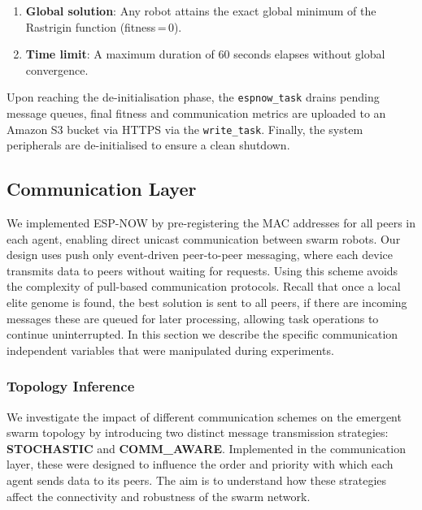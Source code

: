 \documentclass[conference]{IEEEtran}
\begin{document}
\begin{enumerate}
  \item \textbf{Global solution}: Any robot attains the exact global minimum of the Rastrigin function (fitness\,=\,0).
  \item \textbf{Time limit}: A maximum duration of 60 seconds elapses without global convergence.
\end{enumerate}

Upon reaching the de-initialisation phase, the \texttt{espnow\_task} drains pending message queues, final fitness and communication metrics are uploaded to an Amazon S3 bucket via HTTPS via the \texttt{write\_task}. Finally, the system peripherals are de-initialised to ensure a clean shutdown.

\subsection{Communication Layer}\label{sec:comm-layer}

We implemented ESP-NOW by pre-registering the MAC addresses for all peers in each agent, enabling direct unicast communication between swarm robots. Our design uses push only event-driven peer-to-peer messaging, where each device transmits data to peers without waiting for requests. Using this scheme avoids the complexity of pull-based communication protocols. Recall that once a local elite genome is found, the best solution is sent to all peers, if there are incoming messages these are queued for later processing, allowing task operations to continue uninterrupted. In this section we describe the specific communication independent variables that were manipulated during experiments.\\

\subsubsection{Topology Inference}\label{sec:topology-inference}


We investigate the impact of different communication schemes on the emergent swarm topology by introducing two distinct message transmission strategies: \textbf{STOCHASTIC} and \textbf{COMM\_AWARE}. Implemented in the communication layer, these were designed to influence the order and priority with which each agent sends data to its peers. The aim is to understand how these strategies affect the connectivity and robustness of the swarm network.\\
\end{document}
